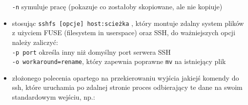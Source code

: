 \begin{itemize}
			\texttt{-n} symuluje pracę (pokazuje co zostałoby skopiowane, ale nie kopiuje)
	\item stosując
		\texttt{sshfs [opcje] host:scieżka}
		, który
		montuje zdalny system plików z użyciem FUSE (filesystem in userspace) oraz SSH, do ważniejszych opcji należy zaliczyć:\\
			\texttt{-p port} określa inny niż domyślny port serwera SSH\\
			\texttt{-o workaround=rename}, który zapewnia poprawne \texttt{mv} na istniejący plik
	\item złożonego polecenia opartego na przekierowaniu wyjścia jakiejś komendy do ssh, które uruchamia po zdalnej stronie proces odbierający te dane na swoim standardowym wejściu, np.:
\end{itemize}

